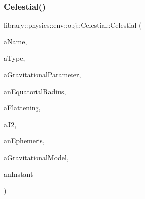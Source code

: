 \subsubsection{\texorpdfstring{Celestial()}{Celestial()}\hspace{0.1cm}{\footnotesize\ttfamily [1/2]}}
{\footnotesize\ttfamily library\+::physics\+::env\+::obj\+::\+Celestial\+::\+Celestial (\begin{DoxyParamCaption}\item[{const String \&}]{a\+Name,  }\item[{const \hyperlink{classlibrary_1_1physics_1_1env_1_1obj_1_1_celestial_aab1f58aa727e639288d65f3d33c4f245}{Celestial\+::\+Type} \&}]{a\+Type,  }\item[{const \hyperlink{classlibrary_1_1physics_1_1units_1_1_derived}{Derived} \&}]{a\+Gravitational\+Parameter,  }\item[{const \hyperlink{classlibrary_1_1physics_1_1units_1_1_length}{Length} \&}]{an\+Equatorial\+Radius,  }\item[{const Real \&}]{a\+Flattening,  }\item[{const Real \&}]{a\+J2,  }\item[{const Shared$<$ \hyperlink{classlibrary_1_1physics_1_1env_1_1_ephemeris}{Ephemeris} $>$ \&}]{an\+Ephemeris,  }\item[{const Shared$<$ \hyperlink{namespacelibrary_1_1physics_1_1env_1_1obj_ade509c84a4970a3420c03c058ada152a}{Gravitational\+Model} $>$ \&}]{a\+Gravitational\+Model,  }\item[{const \hyperlink{classlibrary_1_1physics_1_1time_1_1_instant}{Instant} \&}]{an\+Instant }\end{DoxyParamCaption})}

\mbox{\label{classlibrary_1_1physics_1_1env_1_1obj_1_1_celestial_a7c2263420e3ebdb99523a87716f7575a}} 
